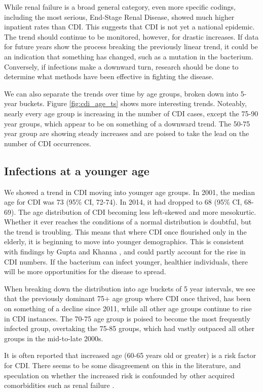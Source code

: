\documentclass[12pt]{ociamthesis}\usepackage[]{graphicx}\usepackage[]{color}
\newcommand{\ci}[3]{#1 (95\% CI, #2-#3)}
\begin{document}
While renal failure is a broad general category, even more specific codings, including the most serious, 
End-Stage Renal Disease, showed much higher inpatient rates than CDI. 
This suggests that CDI is not yet a national epidemic. The trend should continue to be
monitored, however, for drastic increases. If data for future years show the process breaking the previously linear trend, it could be an indication
that something has changed, such as a mutation in the bacterium. Conversely, if infections make a downward turn, research should be done
to determine what methods have been effective in fighting the disease.


We can also separate the trends over time by age groups, broken down into 5-year buckets. Figure \ref{fig:cdi_age_ts} shows more interesting trends.
Noteably, nearly every age group is increasing in the number of CDI cases, except the 75-90 year groups, which appear to be on something of a downward trend.
The 50-75 year group are showing steady increases and are poised to take the lead on the number of CDI occurrences. 


\subsection{Infections at a younger age}
We showed a trend in CDI moving into younger age groups. 
In 2001, the median age for CDI was \ci{73}{72}{74}. In 2014, it had dropped to \ci{68}{68}{69}.
The age distribution of CDI becoming less left-skewed and more mesokurtic.
Whether it ever reaches the conditions of a normal distribution is doubtful, 
but the trend is troubling. This means that where CDI once flourished only in the elderly, it is beginning to move into younger demographics. 
This is consistent with findings by Gupta and Khanna \cite{Gupta2014}, and could partly account for the rise in CDI numbers. 
If the bacterium can infect younger, healthier individuals, there will be more opportunities for the disease to spread.

When breaking down the distribution into age buckets of 5 year intervals, we see that the previously dominant 75+ age group where
CDI once thrived, has been on something of a decline since 2011, while all other age groups continue to rise in CDI instances.
The 70-75 age group is poised to become the most frequently infected group, overtaking the 75-85 groups, which had vastly
outpaced all other groups in the mid-to-late 2000s.

It is often reported that increased age (60-65 years old or greater) is a risk factor for CDI.
There seems to be some disagreement on this in the literature, and speculation on whether the increased risk is confounded by other
acquired comorbidities such as renal failure \cite{Krapohl2013, Masgala2014}.
\end{document}
